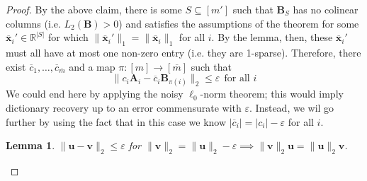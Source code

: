 \documentclass[journal, onecolumn]{IEEEtran}
\newtheorem{lemma}{Lemma}
\begin{document}
\begin{proof}
By the above claim, there is some $S \subseteq [m']$ such that $\mathbf{B}_S$ has no colinear columns (i.e. $L_2(\mathbf{B}) > 0$) and satisfies the assumptions of the theorem for some $\mathbf{\overline x}_i' \in \mathbb{R}^{|S|}$ for which $\|\mathbf{\overline x}_i'\|_1 = \|\mathbf{\overline x}_i\|_1$ for all $i$. By the lemma, then, these $\mathbf{\overline x}_i'$ must all have at most one non-zero entry (i.e. they are 1-sparse). Therefore, there exist $\overline c_1, \ldots, \overline c_{\overline m}$ and a map $\pi: [m] \to [\overline m]$ such that 
\begin{equation}
\|c_i \mathbf{A}_i - \overline c_i \mathbf{B}_{\pi(i)}\|_2 \leq \varepsilon \ \ \text{for all $i$}
\end{equation}
We could end here by applying the noisy $\ell_0$-norm theorem; this would imply dictionary recovery up to an error commensurate with $\varepsilon$. Instead, we wil go further by using the fact that in this case we know $|\overline c_i| = |c_i| - \varepsilon$ for all $i$.

\begin{lemma}\label{lemma2}
$\|\mathbf{u} - \mathbf{v}\|_2 \leq \varepsilon$ for $\|\mathbf{v}\|_2 = \|\mathbf{u}\|_2 - \varepsilon \implies \|\mathbf{v}\|_2 \mathbf{u} = \|\mathbf{u}\|_2 \mathbf{v}$.
\end{lemma}


\end{proof}
\end{document}
